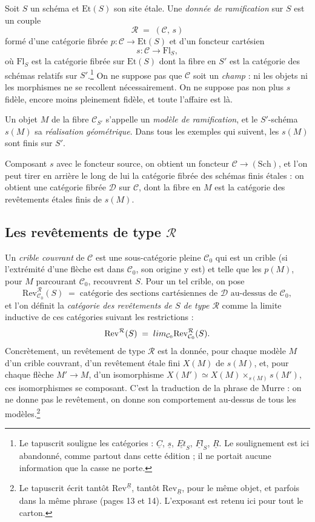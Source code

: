 \documentclass[11pt,a4paper]{article}
\begin{document}
Soit $S$ un schéma et $\mathrm{Et}(S)$ son site étale. Une \emph{donnée de
ramification} sur $S$ est un couple
\[
  \mathcal{R} \;=\; (\mathcal{C},\, s)
\]
formé d'une catégorie fibrée $p : \mathcal{C} \to \mathrm{Et}(S)$ et d'un
foncteur cartésien
\[
  s : \mathcal{C} \longrightarrow \mathrm{Fl}_{S} ,
\]
où $\mathrm{Fl}_{S}$ est la catégorie fibrée sur $\mathrm{Et}(S)$ dont la fibre
en $S'$ est la catégorie des schémas relatifs sur $S'$.\footnote{Le tapuscrit
souligne les catégories : $\underline{C}$, $\underline{s}$, $\underline{Et}_S$,
$\underline{Fl}_S$, $\underline{R}$. Le soulignement est ici abandonné, comme
partout dans cette édition ; il ne portait aucune information que la casse ne
porte.} On ne suppose pas que $\mathcal{C}$ soit un \emph{champ} : ni les
objets ni les morphismes ne se recollent nécessairement. On ne suppose pas non
plus $s$ fidèle, encore moins pleinement fidèle, et toute l'affaire est là.

Un objet $M$ de la fibre $\mathcal{C}_{S'}$ s'appelle un \emph{modèle de
ramification}, et le $S'$-schéma $s(M)$ sa \emph{réalisation géométrique}. Dans
tous les exemples qui suivent, les $s(M)$ sont finis sur $S'$.

Composant $s$ avec le foncteur source, on obtient un foncteur
$\mathcal{C} \to (\mathrm{Sch})$, et l'on peut tirer en arrière le long de lui
la catégorie fibrée des schémas finis étales : on obtient une catégorie fibrée
$\mathcal{D}$ sur $\mathcal{C}$, dont la fibre en $M$ est la catégorie des
revêtements étales finis de $s(M)$.

\subsection*{Les revêtements de type $\mathcal{R}$}

Un \emph{crible couvrant} de $\mathcal{C}$ est une sous-catégorie pleine
$\mathcal{C}_{0}$ qui est un crible (si l'extrémité d'une flèche est dans
$\mathcal{C}_{0}$, son origine y est) et telle que les $p(M)$, pour $M$
parcourant $\mathcal{C}_{0}$, recouvrent $S$. Pour un tel crible, on pose
\[
  \mathrm{Rev}^{\mathcal{R}}_{\mathcal{C}_{0}}(S) \;=\;
  \text{catégorie des sections cartésiennes de } \mathcal{D}
  \text{ au-dessus de } \mathcal{C}_{0} ,
\]
et l'on définit la \emph{catégorie des revêtements de $S$ de type
$\mathcal{R}$} comme la limite inductive de ces catégories suivant les
restrictions :
\[
  \mathrm{Rev}^{\mathcal{R}}(S) \;=\;
  \varinjlim_{\mathcal{C}_{0}} \mathrm{Rev}^{\mathcal{R}}_{\mathcal{C}_{0}}(S) .
\]
Concrètement, un revêtement de type $\mathcal{R}$ est la donnée, pour chaque
modèle $M$ d'un crible couvrant, d'un revêtement étale fini $X(M)$ de $s(M)$,
et, pour chaque flèche $M' \to M$, d'un isomorphisme
$X(M') \simeq X(M) \times_{s(M)} s(M')$, ces isomorphismes se composant.
C'est la traduction de la phrase de Murre : on ne donne pas le
revêtement, on donne son comportement au-dessus de tous les
modèles.\footnote{Le tapuscrit écrit tantôt
$\mathrm{Rev}^{\underline{R}}$, tantôt $\mathrm{Rev}_{\underline{R}}$, pour le
même objet, et parfois dans la même phrase (pages 13 et 14). L'exposant est
retenu ici pour tout le carton.}
\end{document}

